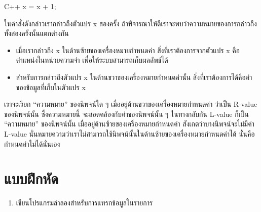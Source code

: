 \latintext
\begin{codelist}{C++}{}
x = x + 1;
\end{codelist}
\thaitext

ใน{\wbr}คำสั่ง{\wbr}ดังกล่าว{\wbr}เรา{\wbr}กล่าว{\wbr}ถึง{\wbr}ตัวแปร {\ct x} สอง{\wbr}ครั้ง{\wbr}
ถ้า{\wbr}พิจารณา{\wbr}ให้{\wbr}ดี{\wbr}เรา{\wbr}จะ{\wbr}พบ{\wbr}ว่าความ{\wbr}หมาย{\wbr}ของ{\wbr}การ{\wbr}กล่าว{\wbr}ถึง{\wbr}ทั้ง{\wbr}สอง{\wbr}ครั้งนั้น{\wbr}แตกต่าง{\wbr}กัน{\wbr}

\begin{itemize}
\item เมื่อ{\wbr}เรา{\wbr}กล่าว{\wbr}ถึง {\ct x} ใน{\wbr}ด้าน{\wbr}ซ้าย{\wbr}ของ{\wbr}เครื่องหมาย{\wbr}กำหนด{\wbr}ค่า{\wbr}
  สิ่ง{\wbr}ที่{\wbr}เรา{\wbr}ต้องการ{\wbr}จาก{\wbr}ตัวแปร {\ct x} คือ{\wbr}ตำแหน่ง{\wbr}ใน{\wbr}หน่วยความจำ{\wbr}
  เพื่อให้{\wbr}ระบบ{\wbr}สามารถ{\wbr}เก็บ{\wbr}ผลลัพธ์{\wbr}ได้{\wbr}
\item สำหรับ{\wbr}การ{\wbr}กล่าว{\wbr}ถึง{\wbr}ตัวแปร {\ct x} ใน{\wbr}ด้าน{\wbr}ขวา{\wbr}ของ{\wbr}เครื่องหมาย{\wbr}กำหนด{\wbr}ค่า{\wbr}นั้น{\wbr}
  สิ่ง{\wbr}ที่{\wbr}เรา{\wbr}ต้องการ{\wbr}ได้{\wbr}คือ{\wbr}ค่า{\wbr}ของ{\wbr}ข้อมูล{\wbr}ที่{\wbr}เก็บ{\wbr}ใน{\wbr}ตัวแปร {\ct x}
\end{itemize}

เรา{\wbr}จะ{\wbr}เรียก ``ความหมาย'' ของ{\wbr}นิพจน์{\wbr}ใด ๆ เมื่อ{\wbr}อยู่{\wbr}ด้าน{\wbr}ขวา{\wbr}ของ{\wbr}เครื่องหมาย{\wbr}กำหนด{\wbr}ค่า{\wbr}
ว่า{\wbr}เป็น R-value ของ{\wbr}นิพจน์{\wbr}นั้น ซึ่ง{\wbr}ความหมาย{\wbr}นี้ จะ{\wbr}สอดคล้อง{\wbr}กับ{\wbr}ค่า{\wbr}ของ{\wbr}นิพจน์{\wbr}นั้น ๆ
ใน{\wbr}ทาง{\wbr}กลับ{\wbr}กัน L-value ก็{\wbr}เป็น ``ความหมาย'' ของ{\wbr}นิพจน์{\wbr}นั้น{\wbr}
เมื่อ{\wbr}อยู่{\wbr}ด้าน{\wbr}ซ้าย{\wbr}ของ{\wbr}เครื่องหมาย{\wbr}กำหนด{\wbr}ค่า สังเกต{\wbr}ว่า{\wbr}บาง{\wbr}นิพจน์{\wbr}จะ{\wbr}ไม่{\wbr}มี{\wbr}ค่า L-value
นั่น{\wbr}หมายความ{\wbr}ว่า{\wbr}เรา{\wbr}ไม่{\wbr}สามารถ{\wbr}ใช้{\wbr}นิพจน์{\wbr}นั้น{\wbr}ใน{\wbr}ด้าน{\wbr}ซ้าย{\wbr}ของ{\wbr}เครื่องหมาย{\wbr}กำหนด{\wbr}ค่า{\wbr}ได้ นั่น{\wbr}คือ{\wbr}
กำหนด{\wbr}ค่า{\wbr}ไม่{\wbr}ได้{\wbr}นั่นเอง{\wbr}

\section{แบบฝึกหัด}

\begin{enumerate}
\item เขียน{\wbr}โปรแกรม{\wbr}ลำ{\wbr}ลอง{\wbr}สำหรับ{\wbr}การ{\wbr}แทรก{\wbr}ข้อมูล{\wbr}ใน{\wbr}รายการ{\wbr}
\end{enumerate}
